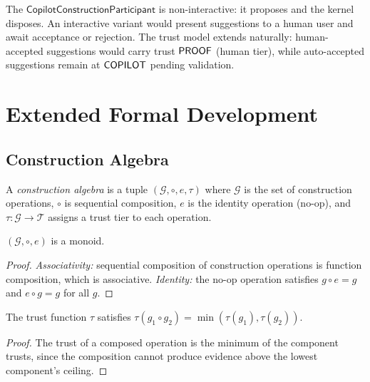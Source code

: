 \documentclass[11pt]{article}
\newcommand{\CCP}{\mathsf{CopilotConstructionParticipant}}
\begin{document}
\begin{remark}
The $\CCP$ is non-interactive: it proposes and the kernel
disposes.  An interactive variant would present suggestions
to a human user and await acceptance or rejection.  The
trust model extends naturally: human-accepted suggestions
would carry trust $\mathsf{PROOF}$ (human tier), while auto-accepted
suggestions remain at $\mathsf{COPILOT}$ pending validation.
\end{remark}

\section{Extended Formal Development}\label{app:extended}

\subsection{Construction Algebra}

\begin{definition}\label{def:conalg}
A \emph{construction algebra} is a tuple
$(\mathcal{G}, \circ, e, \tau)$ where $\mathcal{G}$ is the
set of construction operations, $\circ$ is sequential
composition, $e$ is the identity operation (no-op), and
$\tau \colon \mathcal{G} \to \mathcal{T}$ assigns a trust
tier to each operation.
\end{definition}

\begin{lemma}%
\label{lem:conalgmonoid}
$(\mathcal{G}, \circ, e)$ is a monoid.
\end{lemma}
\begin{proof}
\emph{Associativity:} sequential composition of construction
operations is function composition, which is associative.
\emph{Identity:} the no-op operation satisfies
$g \circ e = g$ and $e \circ g = g$ for all $g$.
\end{proof}

\begin{lemma}%
\label{lem:trusthom}
The trust function $\tau$ satisfies
$\tau(g_1 \circ g_2) = \min(\tau(g_1), \tau(g_2))$.
\end{lemma}
\begin{proof}
The trust of a composed operation is the minimum of the
component trusts, since the composition cannot produce
evidence above the lowest component's ceiling.
\end{proof}
\end{document}
